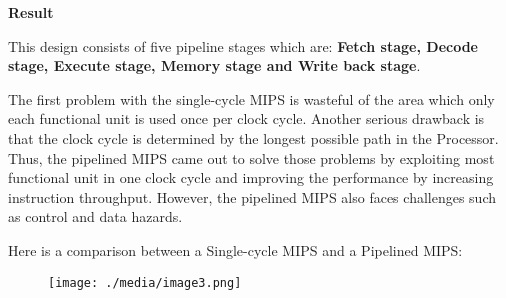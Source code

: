\documentclass[12pt]{article}
\begin{document}

\par


\vspace{\baselineskip}

\vspace{\baselineskip}
{\fontsize{22pt}{26.4pt}\selectfont \textbf{Result}\par}\par


\vspace{\baselineskip}
{\fontsize{18pt}{21.6pt}\selectfont This design consists of five pipeline stages which are: \textbf{Fetch stage, Decode stage, Execute stage, Memory stage and Write back stage}.\par}\par

{\fontsize{18pt}{21.6pt}\selectfont The first problem with the single-cycle MIPS is wasteful of the area which only each functional unit is used once per clock cycle. Another serious drawback is that the clock cycle is determined by the longest possible path in the Processor. Thus, the pipelined MIPS came out to solve those problems by exploiting most functional unit in one clock cycle and improving the performance by increasing instruction throughput. However, the pipelined MIPS also faces challenges such as control and data hazards.\par}\par


\vspace{\baselineskip}
{\fontsize{18pt}{21.6pt}\selectfont Here is a comparison between a Single-cycle MIPS and a Pipelined MIPS:\par}\par




\begin{figure}[H]
	\begin{Center}
		\texttt{[image: ./media/image3.png]}
	\end{Center}
\end{figure}



\\
\par
\end{document}
